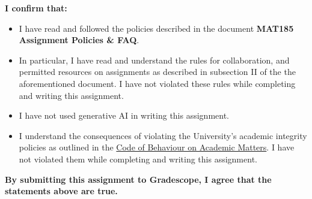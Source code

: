 \documentclass[10pt,addpoints,answers]{exam}
\begin{document}
\vspace*{0.1in}


\bigskip
\large \textbf{I confirm that:}
\normalsize

\begin{itemize} 
\item I have read and followed the policies described in the document {\bf
    MAT185 Assignment Policies \& FAQ}.
\item In particular, I have read and understand the rules for
  collaboration, and permitted resources on assignments as described in
  subsection II of the the aforementioned document. I have not violated
  these rules while completing and writing this assignment.
\item I have not used generative AI in writing this assignment.
\item I understand the consequences of violating the University's academic
  integrity policies as outlined in the
  \href{http://www.governingcouncil.utoronto.ca/policies/behaveac.htm}{Code of
    Behaviour on Academic Matters}. I have not violated them while completing
  and writing this assignment.
\end{itemize}
\bigskip

\large \textbf{By submitting this assignment to Gradescope, I agree that the
  statements above are true.}  \normalsize

\newpage
\end{document}
